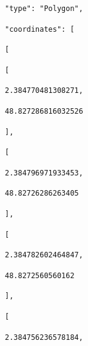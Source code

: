 \documentclass[
  11pt,
  french,
]{article}
\begin{document}
\begin{tcolorbox}[title= Chargement du jeu de données sous un format hiérarchisé dans Python ,colback=boitecode]
\begin{lstlisting}[style=code]
                "type": "Polygon",\end{lstlisting}
\begin{lstlisting}[style=code]
                "coordinates": [\end{lstlisting}
\begin{lstlisting}[style=code]
                    [\end{lstlisting}
\begin{lstlisting}[style=code]
                        [\end{lstlisting}
\begin{lstlisting}[style=code]
                            2.384770481308271,\end{lstlisting}
\begin{lstlisting}[style=code]
                            48.827286816032526\end{lstlisting}
\begin{lstlisting}[style=code]
                        ],\end{lstlisting}
\begin{lstlisting}[style=code]
                        [\end{lstlisting}
\begin{lstlisting}[style=code]
                            2.384796971933453,\end{lstlisting}
\begin{lstlisting}[style=code]
                            48.82726286263405\end{lstlisting}
\begin{lstlisting}[style=code]
                        ],\end{lstlisting}
\begin{lstlisting}[style=code]
                        [\end{lstlisting}
\begin{lstlisting}[style=code]
                            2.384782602464847,\end{lstlisting}
\begin{lstlisting}[style=code]
                            48.8272560560162\end{lstlisting}
\begin{lstlisting}[style=code]
                        ],\end{lstlisting}
\begin{lstlisting}[style=code]
                        [\end{lstlisting}
\begin{lstlisting}[style=code]
                            2.384756236578184,\end{lstlisting}

\end{tcolorbox}
\end{document}
